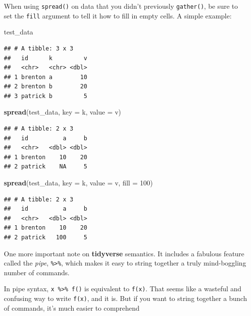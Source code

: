 \documentclass[
  12pt,
  oneside,openany]{book}
\newenvironment{Shaded}{\begin{snugshade}}{\end{snugshade}}
\newcommand{\DataTypeTok}[1]{\textcolor[rgb]{0.13,0.29,0.53}{#1}}
\newcommand{\DecValTok}[1]{\textcolor[rgb]{0.00,0.00,0.81}{#1}}
\newcommand{\KeywordTok}[1]{\textcolor[rgb]{0.13,0.29,0.53}{\textbf{#1}}}
\newcommand{\NormalTok}[1]{#1}
\begin{document}
When using \texttt{spread()} on data that you didn't previously \texttt{gather()}, be sure to set the \texttt{fill} argument to tell it how to fill in empty cells. A simple example:

\begin{Shaded}
\begin{Highlighting}[]
\NormalTok{test\_data}
\end{Highlighting}
\end{Shaded}

\begin{verbatim}
## # A tibble: 3 x 3
##   id      k         v
##   <chr>   <chr> <dbl>
## 1 brenton a        10
## 2 brenton b        20
## 3 patrick b         5
\end{verbatim}

\begin{Shaded}
\begin{Highlighting}[]
\KeywordTok{spread}\NormalTok{(test\_data, }\DataTypeTok{key =}\NormalTok{ k, }\DataTypeTok{value =}\NormalTok{ v)}
\end{Highlighting}
\end{Shaded}

\begin{verbatim}
## # A tibble: 2 x 3
##   id          a     b
##   <chr>   <dbl> <dbl>
## 1 brenton    10    20
## 2 patrick    NA     5
\end{verbatim}

\begin{Shaded}
\begin{Highlighting}[]
\KeywordTok{spread}\NormalTok{(test\_data, }\DataTypeTok{key =}\NormalTok{ k, }\DataTypeTok{value =}\NormalTok{ v, }\DataTypeTok{fill =} \DecValTok{100}\NormalTok{)}
\end{Highlighting}
\end{Shaded}

\begin{verbatim}
## # A tibble: 2 x 3
##   id          a     b
##   <chr>   <dbl> <dbl>
## 1 brenton    10    20
## 2 patrick   100     5
\end{verbatim}

One more important note on \textbf{tidyverse} semantics. It includes a fabulous feature called the \emph{pipe}, \texttt{\%\textgreater{}\%}, which makes it easy to string together a truly mind-boggling number of commands.

In pipe syntax, \texttt{x\ \%\textgreater{}\%\ f()} is equivalent to \texttt{f(x)}. That seems like a wasteful and confusing way to write \texttt{f(x)}, and it is. But if you want to string together a bunch of commands, it's much easier to comprehend
\end{document}
